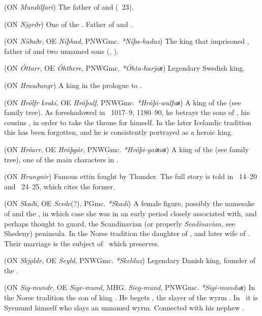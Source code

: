 \begin{itemize}
 (ON \emph{Mundilfari})
  The father of  and  (\Vafthrudnismal\ 23).

 (ON \emph{Njǫrðr})
  One of the . Father of  and .

 (ON \emph{Níðuðr}, OE \emph{Níþhad}, PNWGmc. \emph{*Níþa-haduz})
  The king that imprisoned , father of  and two unnamed sons (\Volundarkvida, \Deor).

 (ON \emph{Óttarr}, OE \emph{Óhthere}, PNWGmc. \emph{*Óhta-harjaʀ})
  Legendary Swedish king.

 (ON \emph{Hrauðungr})
  A king in the prologue to \Grimnismal.

 (ON \emph{Hrólfr kraki}, OE \emph{Hróþulf}, PNWGmc. \emph{*Hróþi-wulfaʀ})
  A king of the  (see family tree). As foreshadowed in \Beowulf\ 1017–9, 1180–90, he betrays the sons of , his cousins , in order to take the throne for himself. In the later Icelandic tradition this has been forgotten, and he is consistently portrayed as a heroic king.

 (ON \emph{Hróarr}, OE \emph{Hróþgár}, PNWGmc. \emph{*Hróþi-gaiʀaʀ})
  A king of the  (see family tree), one of the main characters in \Beowulf.

 (ON \emph{Hrungnir})
  Famous ettin fought by Thunder.  The full story is told in \Haustlong\ 14–20 and \Skaldskaparmal\ 24–25, which cites the former.

 (ON \emph{Skaði}, OE \emph{Scede}(?), PGmc. \emph{*Skadī})
  A female figure, possibly the namesake of  and the , in which case she was in an early period closely associated with, and perhaps thought to guard, the Scandinavian (or properly \emph{Scadinavian}, see Shedeny) peninsula.
  In the Norse tradition the daughter of , and later wife of .  Their marriage is the subject of \Gylfaginning\ which preserves.

 (ON \emph{Skjǫldr}, OE \emph{Scyld}, PNWGmc. \emph{*Skelduz})
  Legendary Danish king, founder of the .

 (ON \emph{Sig-mundr}, OE \emph{Sige-mund}, MHG. \emph{Sieg-mund}, PNWGmc. \emph{*Sigi-munduʀ})
  In the Norse tradition the son of king .  He begets , the slayer of the wyrm .  In \Beowulf\ it is Syemund himself who slays an unnamed wyrm.  Connected with his nephew .


\end{itemize}
